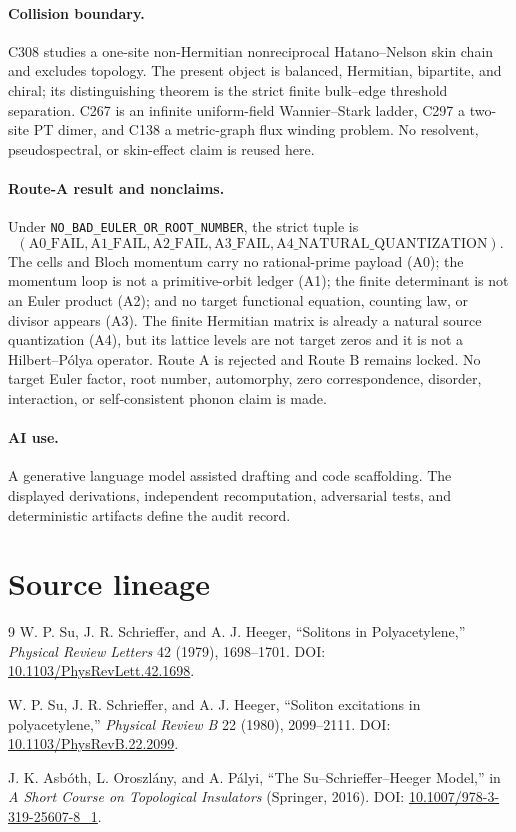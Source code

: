 \documentclass[10pt]{article}
\begin{document}
\paragraph{Collision boundary.}
C308 studies a one-site non-Hermitian nonreciprocal Hatano--Nelson skin
chain and excludes topology.  The present object is balanced, Hermitian,
bipartite, and chiral; its distinguishing theorem is the strict finite
bulk--edge threshold separation.  C267 is an infinite uniform-field
Wannier--Stark ladder, C297 a two-site PT dimer, and C138 a metric-graph flux
winding problem.  No resolvent, pseudospectral, or skin-effect claim is
reused here.

\paragraph{Route-A result and nonclaims.}
Under \texttt{NO\_BAD\_EULER\_OR\_ROOT\_NUMBER}, the strict tuple is
\[
 (\mathrm{A0\_FAIL},\mathrm{A1\_FAIL},\mathrm{A2\_FAIL},
  \mathrm{A3\_FAIL},\mathrm{A4\_NATURAL\_QUANTIZATION}).
\]
The cells and Bloch momentum carry no rational-prime payload (A0); the
momentum loop is not a primitive-orbit ledger (A1); the finite determinant
is not an Euler product (A2); and no target functional equation, counting
law, or divisor appears (A3).  The finite Hermitian matrix is already a
natural source quantization (A4), but its lattice levels are not target
zeros and it is not a Hilbert--P\'olya operator.  Route A is rejected and
Route B remains locked.  No target Euler factor, root number, automorphy,
zero correspondence, disorder, interaction, or self-consistent phonon
claim is made.

\paragraph{AI use.}
A generative language model assisted drafting and code scaffolding.  The
displayed derivations, independent recomputation, adversarial tests, and
deterministic artifacts define the audit record.
\fi

\section*{Source lineage}
\begin{thebibliography}{9}
W. P. Su, J. R. Schrieffer, and A. J. Heeger,
``Solitons in Polyacetylene,'' \emph{Physical Review Letters} 42 (1979),
1698--1701. DOI:
\href{https://doi.org/10.1103/PhysRevLett.42.1698}{10.1103/PhysRevLett.42.1698}.

W. P. Su, J. R. Schrieffer, and A. J. Heeger,
``Soliton excitations in polyacetylene,'' \emph{Physical Review B} 22
(1980), 2099--2111. DOI:
\href{https://doi.org/10.1103/PhysRevB.22.2099}{10.1103/PhysRevB.22.2099}.

J. K. Asb\'oth, L. Oroszl\'any, and A. P\'alyi,
``The Su--Schrieffer--Heeger Model,'' in \emph{A Short Course on
Topological Insulators} (Springer, 2016).
DOI: \href{https://doi.org/10.1007/978-3-319-25607-8_1}%
{10.1007/978-3-319-25607-8\_1}.
\end{thebibliography}
\end{document}
